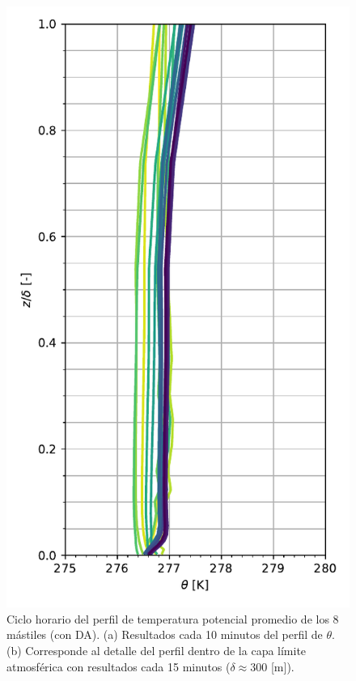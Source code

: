 \begin{figure}[H]
\begin{minipage}{0.5\linewidth}
		\includegraphics[width=0.9\linewidth,trim={0cm 5mm 0cm 0cm},clip]{Imagenes/06/bol_da/mean_profile}%
	\end{minipage}%
	
	\caption{Ciclo horario del perfil de temperatura potencial promedio de los 8 mástiles (con DA). (a) Resultados cada 10 minutos del perfil de $\theta$. (b) Corresponde al detalle del perfil dentro de la capa límite atmosférica con resultados cada 15 minutos ($\delta\approx300$ [m]).}
	\label{fig:06_bol_da_pbl}
\end{figure}

